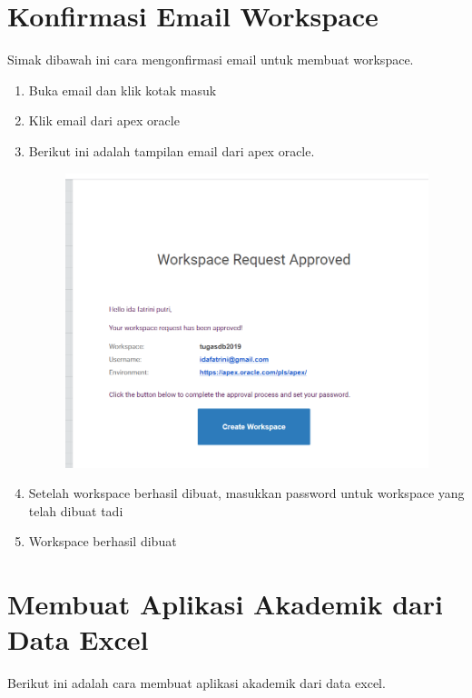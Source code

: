 \section{Konfirmasi Email Workspace}
Simak dibawah ini cara mengonfirmasi email untuk membuat workspace.
\begin{enumerate}
    \item Buka email dan klik kotak masuk
    \item Klik email dari apex oracle
    \item Berikut ini adalah tampilan email dari apex oracle.
    
\begin{figure}[!htbp]
    \centering
    \includegraphics[scale=0.5]{gambar/email.png}
    \label{penanda}
\end{figure}    

    \item Setelah workspace berhasil dibuat, masukkan password untuk workspace yang telah dibuat tadi
    \item Workspace berhasil dibuat
\end{enumerate}

\section{Membuat Aplikasi Akademik dari Data Excel}
Berikut ini adalah cara membuat aplikasi akademik dari data excel.

